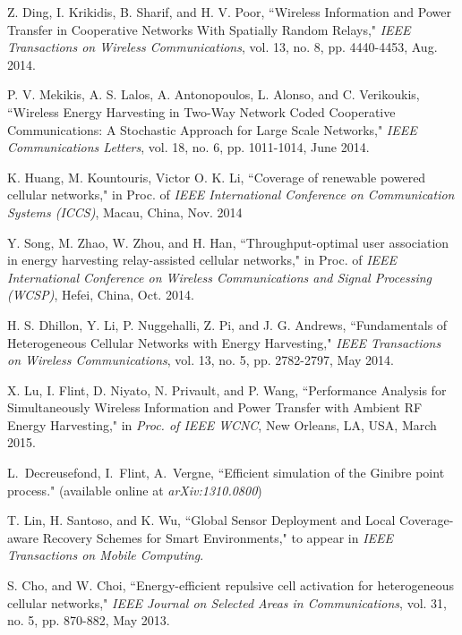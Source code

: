 \documentclass[12pt,draftclsnofoot,onecolumn]{IEEEtran}
\begin{document}
\begin{thebibliography}{99}
Z. Ding, I. Krikidis, B. Sharif, and H. V. Poor, ``Wireless Information and Power Transfer in Cooperative Networks With Spatially Random Relays," \emph{IEEE Transactions on Wireless Communications}, 
vol. 13, no. 8, pp. 4440-4453, Aug. 2014.

P. V. Mekikis, A. S. Lalos, A. Antonopoulos, L. Alonso, and C. Verikoukis, ``Wireless Energy Harvesting in Two-Way Network Coded Cooperative Communications: A Stochastic Approach for Large Scale Networks," \emph{IEEE Communications Letters}, vol. 18, no. 6, pp. 1011-1014, June  2014. 




K. Huang, M. Kountouris, Victor O. K. Li, ``Coverage of renewable powered cellular networks," in Proc. of \emph{IEEE International Conference on Communication Systems (ICCS)}, Macau, China, Nov. 2014  

Y. Song, M. Zhao, W. Zhou, and H. Han, ``Throughput-optimal user association in energy harvesting relay-assisted cellular networks," 
 in Proc. of \emph{IEEE International Conference on 
Wireless Communications and Signal Processing (WCSP)}, Hefei, China, Oct. 2014.


H. S. Dhillon, Y. Li, P. Nuggehalli, Z. Pi, and J. G. Andrews, ``Fundamentals of Heterogeneous Cellular Networks with Energy Harvesting," \emph{IEEE Transactions on Wireless Communications},  
vol. 13, no. 5, pp. 2782-2797, May 2014. 

X. Lu, I. Flint, D. Niyato, N. Privault, and P. Wang, ``Performance Analysis for Simultaneously Wireless Information and Power Transfer with Ambient RF Energy Harvesting," in \emph{Proc. of IEEE WCNC}, New Orleans, LA, USA, March 2015.



L.~Decreusefond, I.~Flint, A.~Vergne, ``Efficient simulation of the Ginibre point process." (available online at {\em arXiv:1310.0800})  



T. Lin, H. Santoso, and K. Wu, ``Global Sensor Deployment and Local Coverage-aware Recovery Schemes for Smart Environments," to appear in 
\emph{IEEE Transactions on Mobile Computing}.  





S. Cho, and W. Choi, ``Energy-efficient repulsive cell activation for heterogeneous cellular networks," \emph{IEEE Journal on Selected Areas in Communications}, vol. 31, no. 5, pp. 870-882, May 2013. 
 

\end{thebibliography}
\end{document}
